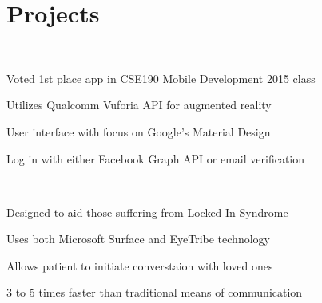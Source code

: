 \documentclass[]{deedy-resume-openfont}
\begin{document}
\begin{minipage}[t]{0.66\textwidth}


\section{Projects}
\href{http://augmonted.github.io}{} \\
\begin{tightemize}
\item Voted 1st place app in CSE190 Mobile Development 2015 class
\item Utilizes Qualcomm Vuforia API for augmented reality
\item User interface with focus on Google's Material Design
\item Log in with either Facebook Graph API or email verification
\end{tightemize}
\sectionsep

\href{https://www.youtube.com/watch?v=mYUiSeqqgDY&list=PLbbCsk7MUIGfXpnd9XN-pBeCd6ixuCQ2X}{} \\
\begin{tightemize}
\item Designed to aid those suffering from Locked-In Syndrome
\item Uses both Microsoft Surface and EyeTribe technology
\item Allows patient to initiate converstaion with loved ones
\item 3 to 5 times faster than traditional means of communication
\end{tightemize}
\sectionsep


\end{minipage}
\end{document}
